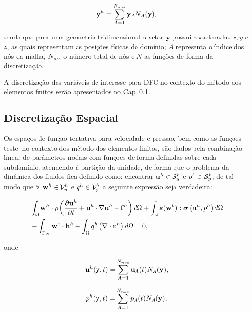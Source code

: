 \documentclass[tese_patricia]{subfiles}%
\begin{document}
\begin{align}
	\mathbf{y}^{h} = \sum_{A = 1}^{N_{nos}} \mathbf{y}_{A}N_{A}(\mathbf{y}),
\end{align}

\noindent sendo que para uma geometria tridimensional o vetor $\mathbf{y}$ possui coordenadas $x,y$ e $z$, as quais representam as posições físicas do domínio; $A$ representa o índice dos nós da malha, $N_{nos}$ o número total de nós e $N$ as funções de forma da discretização.

A discretização das variáveis de interesse para DFC no contexto do método dos elementos finitos serão apresentados no Cap. \ref{capitulo:Cap2:DiscEspacial}.


\subsection{Discretização Espacial} \label{capitulo:Cap2:DiscEspacial}

Os espaços de função tentativa para velocidade e pressão, bem como as funções teste, no contexto dos método dos elementos finitos, são dados pela combinação linear de parâmetros nodais com funções de forma definidas sobre cada subdomínio, atendendo à partição da unidade, de forma que o problema da dinâmica dos fluidos fica definido como: encontrar $\mathbf{u}^h \in \mathcal{S}_u^h$ e $p^h \in \mathcal{S}_p^h$, de tal modo que $\forall$ $\mathbf{w}^h \in \mathcal{V}_u^h$ e $q^h \in \mathcal{V}_p^h$ a seguinte expressão seja verdadeira:

\begin{align}
	\begin{split}
		&\int_{\Omega} \mathbf{w}^h \cdot \rho \left(\frac{\partial\mathbf{u}^h}{\partial t} + \mathbf{u}^h\cdot\nabla\mathbf{u}^h - \mathbf{f}^{h}\right) d\Omega + \int_{\Omega} \bm{\varepsilon}(\mathbf{w}^h) : \boldsymbol{\sigma}\left(\mathbf{u}^h,p^h \right)  d\Omega\\ & - \int_{\Gamma_{N}} \mathbf{w}^h \cdot \mathbf{h}^{h} + \int_{\Omega} q^h \left(\nabla \cdot \mathbf{u}^h\right) d \Omega = 0,  \label{eq:NSWeakForm2} 
	\end{split}
\end{align}

\noindent onde:

\begin{align}
\mathbf{u}^{h}(\mathbf{y},t) = \sum_{A = 1}^{N_{nos}} \mathbf{u}_{A}(t)N_{A}(\mathbf{y}), \label{eq:dis_vel}
\end{align}

\begin{align}
p^{h}(\mathbf{y},t)  = \sum_{A = 1}^{N_{nos}} p_{A}(t)N_{A}(\mathbf{y}),
\end{align}
\end{document}

